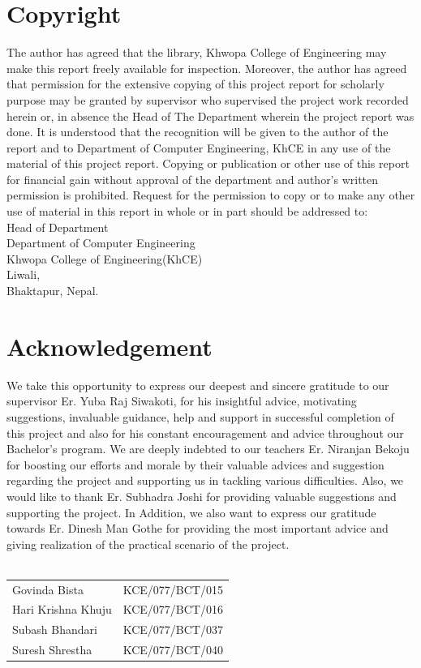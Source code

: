 			\section{Copyright}
		\normalsize
		\justify
		The author has agreed that the library, Khwopa College of Engineering may make this report freely available for inspection. Moreover, the author
has agreed that permission for the extensive copying of this project report for scholarly
purpose may be granted by supervisor who supervised the project work recorded herein
or, in absence the Head of The Department wherein the project report was done. It is
understood that the recognition will be given to the author of the report and to
Department of Computer Engineering, KhCE in
any use of the material of this project report. Copying or publication or other use of this
report for financial gain without approval of the department and author’s written
permission is prohibited. Request for the permission to copy or to make any other use
of material in this report in whole or in part should be addressed to:
\vspace{1.5cm}\\
Head of Department\\
Department of Computer Engineering\\
Khwopa College of Engineering(KhCE)\\
Liwali,\\
Bhaktapur, Nepal.\\
		\break

	
		\large
			\section{Acknowledgement}
		\normalsize
		\justify
			We take this opportunity to express our deepest and sincere gratitude to our supervisor
Er. Yuba Raj Siwakoti, for his insightful advice, motivating suggestions, invaluable
guidance, help and support in successful completion of this project and also for his
constant encouragement and advice throughout our Bachelor’s program.
We are deeply indebted to our teachers Er. Niranjan Bekoju for
boosting our efforts and morale by their valuable advices and suggestion regarding the
project and supporting us in tackling various difficulties.
Also, we would like to thank Er. Subhadra Joshi for providing valuable suggestions and
supporting the project.
In Addition, we also want to express our gratitude towards Er. Dinesh Man Gothe for
providing the most important advice and giving realization of the practical scenario of
the project.\\
\\ 
        \begin{table}[hbt!]
            \begin{tabular}{l l}
				Govinda Bista & KCE/077/BCT/015\\
				Hari Krishna Khuju & KCE/077/BCT/016\\
				Subash Bhandari & KCE/077/BCT/037\\
				Suresh Shrestha & KCE/077/BCT/040\\
		    \end{tabular}
        \end{table}
		\break
		
